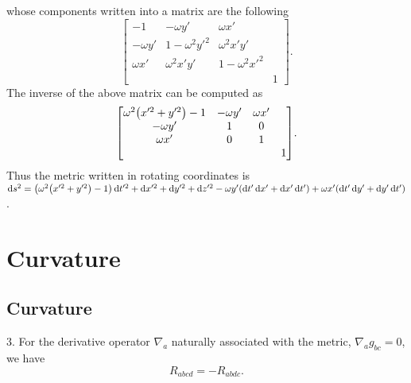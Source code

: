 \documentclass{note}
\numberwithin{equation}{chapter}
\newcommand{\diff}{\operatorname{d}\!}
\begin{document}
whose components written into a matrix are the following
\begin{equation*}
  \begin{bmatrix}
    -1         & -\omega y'     & \omega x'          \\
    -\omega y' & 1-\omega^2y'^2 & \omega^2x'y'       \\
    \omega x'  & \omega^2x'y'   & 1-\omega^2x'^2     \\
               &                &                & 1
  \end{bmatrix}.
\end{equation*}
The inverse of the above matrix can be computed as
\begin{equation*}
  \begin{bmatrix}
    \omega^2\prn{x'^2+y'^2}-1 & -\omega y' & \omega x'     \\
    -\omega y'                & 1          & 0             \\
    \omega x'                 & 0          & 1             \\
                              &            &           & 1
  \end{bmatrix}.
\end{equation*}
Thus the metric written in rotating coordinates is $\diff s^2 =
\prn{\omega^2\prn{x'^2+y'^2}-1}\diff t'^2 + \diff x'^2 + \diff y'^2 + \diff z'^2 -
\omega y'(\diff t'\diff x' + \diff x'\diff t') + \omega x' (\diff t'\diff y' + \diff
y'\diff t')$.

\chapter{Curvature}

\setcounter{section}{1}

\section{Curvature}


\begin{quotebox}
  3. For the derivative operator $\nabla_a$ naturally associated with the
  metric, $\nabla_ag_{bc}=0$, we have
  \begin{equation*}
    R_{abcd} = - R_{abdc}.
  \end{equation*}
\end{quotebox}
\end{document}
